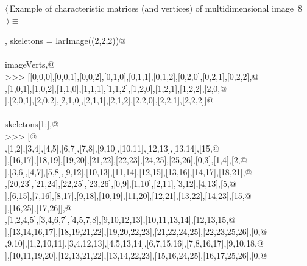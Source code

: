 \documentclass[11pt,oneside]{article}	%
\begin{document}
\begin{flushleft} \small \label{scrap12}
\protect{}$\langle\,$Example of characteristic matrices (and vertices) of multidimensional image\nobreak\ {\footnotesize 8}$\,\rangle\equiv$
\vspace{-1ex}
\begin{list}{}{} \item
\mbox{}\verb@imageVerts, skeletons = larImage((2,2,2))@\\
\mbox{}\verb@@\\
\mbox{}\verb@print imageVerts,@\\
\mbox{}\verb@>>> [[0,0,0],[0,0,1],[0,0,2],[0,1,0],[0,1,1],[0,1,2],[0,2,0],[0,2,1],[0,2,2],@\\
\mbox{}\verb@[1,0,0],[1,0,1],[1,0,2],[1,1,0],[1,1,1],[1,1,2],[1,2,0],[1,2,1],[1,2,2],[2,0,@\\
\mbox{}],[2,0,1],[2,0,2],[2,1,0],[2,1,1],[2,1,2],[2,2,0],[2,2,1],[2,2,2]]@\\
\mbox{}\verb@@\\
\mbox{}\verb@print skeletons[1:],@\\
\mbox{}\verb@>>> [@\\
\mbox{}\verb@[[0,1],[1,2],[3,4],[4,5],[6,7],[7,8],[9,10],[10,11],[12,13],[13,14],[15,@\\
\mbox{}],[16,17],[18,19],[19,20],[21,22],[22,23],[24,25],[25,26],[0,3],[1,4],[2,@\\
\mbox{}],[3,6],[4,7],[5,8],[9,12],[10,13],[11,14],[12,15],[13,16],[14,17],[18,21],@\\
\mbox{}\verb@[19,22],[20,23],[21,24],[22,25],[23,26],[0,9],[1,10],[2,11],[3,12],[4,13],[5,@\\
\mbox{}],[6,15],[7,16],[8,17],[9,18],[10,19],[11,20],[12,21],[13,22],[14,23],[15,@\\
\mbox{}],[16,25],[17,26]],@\\
\mbox{}\verb@[[0,1,3,4],[1,2,4,5],[3,4,6,7],[4,5,7,8],[9,10,12,13],[10,11,13,14],[12,13,15,@\\
\mbox{}],[13,14,16,17],[18,19,21,22],[19,20,22,23],[21,22,24,25],[22,23,25,26],[0,@\\
\mbox{},9,10],[1,2,10,11],[3,4,12,13],[4,5,13,14],[6,7,15,16],[7,8,16,17],[9,10,18,@\\
\mbox{}],[10,11,19,20],[12,13,21,22],[13,14,22,23],[15,16,24,25],[16,17,25,26],[0,@\\

\end{list}
\end{flushleft}
\end{document}
